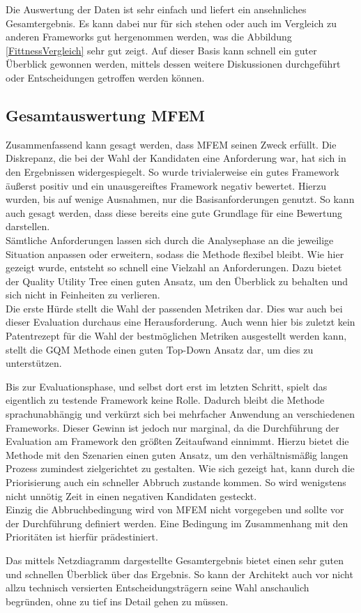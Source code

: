Die Auswertung der Daten ist sehr einfach und liefert ein ansehnliches Gesamtergebnis. Es kann dabei nur für sich stehen oder auch im Vergleich zu anderen Frameworks gut hergenommen werden, was die Abbildung \ref{FittnessVergleich} sehr gut zeigt. Auf dieser Basis kann schnell ein guter Überblick gewonnen werden, mittels dessen weitere Diskussionen durchgeführt oder Entscheidungen getroffen werden können.

\subsection{Gesamtauswertung \ac*{MFEM}}

Zusammenfassend kann gesagt werden, dass \ac{MFEM} seinen Zweck erfüllt. Die Diskrepanz, die bei der Wahl der Kandidaten eine Anforderung war, hat sich in den Ergebnissen widergespiegelt. So wurde trivialerweise ein gutes Framework äußerst positiv und ein unausgereiftes Framework negativ bewertet. Hierzu wurden, bis auf wenige Ausnahmen, nur die Basisanforderungen genutzt. So kann auch gesagt werden, dass diese bereits eine gute Grundlage für eine Bewertung darstellen.\\
Sämtliche Anforderungen lassen sich durch die Analysephase an die jeweilige Situation anpassen oder erweitern, sodass die Methode flexibel bleibt. Wie hier gezeigt wurde, entsteht so schnell eine Vielzahl an Anforderungen. Dazu bietet der Quality Utility Tree einen guten Ansatz, um den Überblick zu behalten und sich nicht in Feinheiten zu verlieren.\\
Die erste Hürde stellt die Wahl der passenden Metriken dar. Dies war auch bei dieser Evaluation durchaus eine Herausforderung. Auch wenn hier bis zuletzt kein Patentrezept für die Wahl der bestmöglichen Metriken ausgestellt werden kann, stellt die \ac{GQM} Methode einen guten Top-Down Ansatz dar, um dies zu unterstützen.

Bis zur Evaluationsphase, und selbst dort erst im letzten Schritt, spielt das eigentlich zu testende Framework keine Rolle. Dadurch bleibt die Methode sprachunabhängig und verkürzt sich bei mehrfacher Anwendung an verschiedenen Frameworks. Dieser Gewinn ist jedoch nur marginal, da die Durchführung der Evaluation am Framework den größten Zeitaufwand einnimmt. Hierzu bietet die Methode mit den Szenarien einen guten Ansatz, um den verhältnismäßig langen Prozess zumindest zielgerichtet zu gestalten. Wie sich gezeigt hat, kann durch die Priorisierung auch ein schneller Abbruch zustande kommen. So wird wenigstens nicht unnötig Zeit in einen negativen Kandidaten gesteckt.\\
Einzig die Abbruchbedingung wird von \ac{MFEM} nicht vorgegeben und sollte vor der Durchführung definiert werden. Eine Bedingung im Zusammenhang mit den Prioritäten ist hierfür prädestiniert.

Das mittels Netzdiagramm dargestellte Gesamtergebnis bietet einen sehr guten und schnellen Überblick über das Ergebnis. So kann der Architekt auch vor nicht allzu technisch versierten Entscheidungsträgern seine Wahl anschaulich begründen, ohne zu tief ins Detail gehen zu müssen.     












